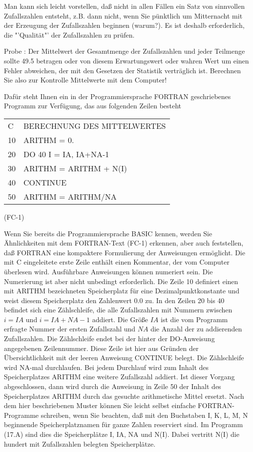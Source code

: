 Man kann sich leicht vorstellen, daß nicht in allen Fällen ein Satz von
sinnvollen Zufallszahlen entsteht, z.B. dann nicht, wenn Sie pünktlich
um Mitternacht mit der Erzeugung der Zufallszahlen beginnen (warum?).
Es ist deshalb erforderlich, die "'Qualität"' der Zufallszahlen zu
prüfen.

Probe : Der Mittelwert der Gesamtmenge der Zufallszahlen und
jeder Teilmenge sollte 49.5 betragen oder von diesem
Erwartungswert oder wahren Wert um einen Fehler abweichen, der
mit den Gesetzen der Statistik verträglich ist. Berechnen Sie
also zur Kontrolle Mittelwerte mit dem Computer!

Dafür steht Ihnen ein in der Programmiersprache FORTRAN geschriebenes
Programm zur Verfügung, das aus folgenden Zeilen besteht

\vspace*{2ex}
\begin{tabular}{ll}
C & BERECHNUNG DES MITTELWERTES\\
10 & ARITHM = 0.\\
20 & DO 40 I = IA, IA+NA-1\\
30 & ARITHM = ARITHM + N(I)\\
40 & CONTINUE\\
50 & ARITHM = ARITHM/NA\\
\end{tabular}                                 \hfill (FC-1)
\vspace*{2ex}

Wenn Sie bereits die Programmiersprache BASIC kennen, werden Sie
Ähnlichkeiten mit dem FORTRAN-Text (FC-1) erkennen, aber auch
feststellen, daß FORTRAN eine kompaktere Formulierung der Anweisungen
ermöglicht. Die mit C eingeleitete erste Zeile enthält einen Kommentar,
der vom Computer überlesen wird. Ausführbare Anweisungen können
numeriert sein. Die Numerierung ist aber nicht unbedingt erforderlich.
Die Zeile 10 definiert einen mit ARITHM bezeichneten Speicherplatz für
eine Dezimalpunktkonstante und weist diesem Speicherplatz den
Zahlenwert 0.0 zu. In den Zeilen 20 bis 40 befindet sich eine
Zählschleife, die alle Zufallszahlen mit Nummern zwischen $i = IA$ und
$i = IA+NA-1$ addiert. Die Größe $IA$ ist die vom Programm erfragte
Nummer der ersten Zufallszahl und $NA$ die Anzahl der zu addierenden
Zufallszahlen. Die Zählschleife endet bei der hinter der DO-Anweisung
angegebenen Zeilennummer. Diese Zeile ist hier aus Gründen der
Übersichtlichkeit mit der leeren Anweisung CONTINUE belegt. Die
Zählschleife wird NA-mal durchlaufen. Bei jedem Durchlauf wird zum
Inhalt des Speicherplatzes ARITHM eine weitere Zufallszahl addiert. Ist
dieser Vorgang abgeschlossen, dann wird durch die Anweisung in Zeile 50
der Inhalt des Speicherplatzes ARITHM durch das gesuchte arithmetische
Mittel ersetzt. Nach dem hier beschriebenen Muster können Sie leicht
selbst einfache FORTRAN-Programme schreiben, wenn Sie beachten, daß mit
den Buchstaben I, K, L, M, N beginnende Speicherplatznamen für ganze
Zahlen reserviert sind. Im Programm (17.A) sind dies die Speicherplätze
I, IA, NA und N(I). Dabei vertritt N(I) die hundert mit Zufallszahlen
belegten Speicherplätze.


